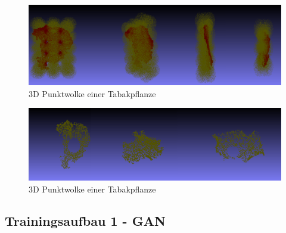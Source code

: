 \documentclass{llncs}
\begin{document}
\begin{figure}[htbp] 
	\centering
	\includegraphics[width=1.0\textwidth]{allsphere.png}
	\caption{3D Punktwolke einer Tabakpflanze}
	\label{fig:Bild53}
\end{figure}

\begin{figure}[htbp] 
	\centering
	\includegraphics[width=1.0\textwidth]{training_destroyed.png}
	\caption{3D Punktwolke einer Tabakpflanze}
	\label{fig:Bild54}
\end{figure}
\newpage


\subsection{Trainingsaufbau 1 - GAN}\label{sec:versuch1-aufbau}
\end{document}
